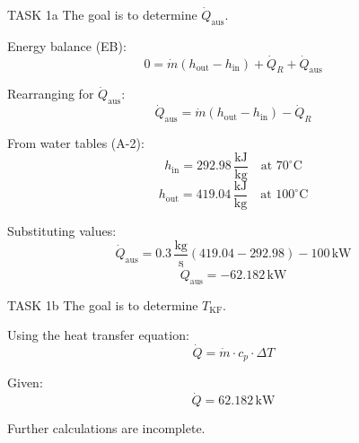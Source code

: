 TASK 1a  
The goal is to determine \( \dot{Q}_{\text{aus}} \).  

Energy balance (EB):  
\[
0 = \dot{m} \left( h_{\text{out}} - h_{\text{in}} \right) + \dot{Q}_R + \dot{Q}_{\text{aus}}
\]  

Rearranging for \( \dot{Q}_{\text{aus}} \):  
\[
\dot{Q}_{\text{aus}} = \dot{m} \left( h_{\text{out}} - h_{\text{in}} \right) - \dot{Q}_R
\]  

From water tables (A-2):  
\[
h_{\text{in}} = 292.98 \, \frac{\text{kJ}}{\text{kg}} \quad \text{at } 70^\circ\text{C}
\]  
\[
h_{\text{out}} = 419.04 \, \frac{\text{kJ}}{\text{kg}} \quad \text{at } 100^\circ\text{C}
\]  

Substituting values:  
\[
\dot{Q}_{\text{aus}} = 0.3 \, \frac{\text{kg}}{\text{s}} \left( 419.04 - 292.98 \right) - 100 \, \text{kW}
\]  
\[
\dot{Q}_{\text{aus}} = -62.182 \, \text{kW}
\]  

TASK 1b  
The goal is to determine \( T_{\text{KF}} \).  

Using the heat transfer equation:  
\[
\dot{Q} = \dot{m} \cdot c_p \cdot \Delta T
\]  

Given:  
\[
\dot{Q} = 62.182 \, \text{kW}
\]  

Further calculations are incomplete.